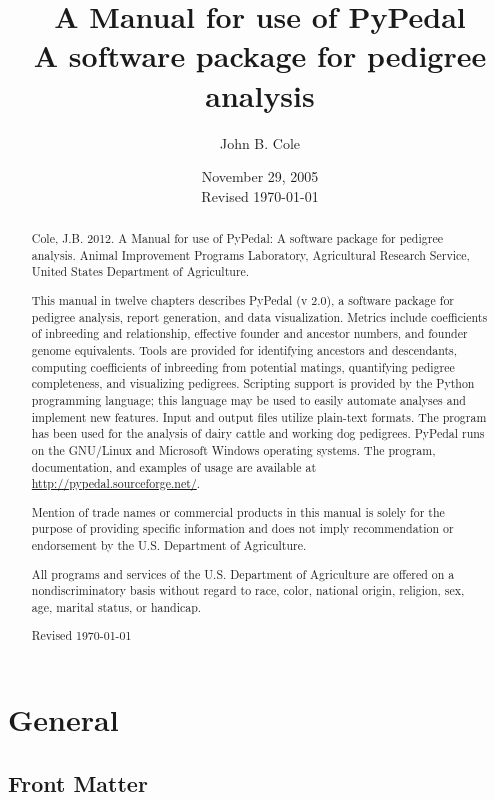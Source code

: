 \documentclass[letterpaper,hyperref,titlepage]{manual}
\title{A Manual for use of PyPedal\\A software package for pedigree analysis}
\author{John B. Cole}
\date{November 29, 2005 \\ Revised \today}                   %
\begin{document}
\maketitle

\begin{abstract}
Cole, J.B.  2012.  A Manual for use of PyPedal: A software package for pedigree analysis.  Animal Improvement Programs Laboratory, Agricultural Research Service, United States Department of Agriculture.

This manual in twelve chapters describes PyPedal (v 2.0), a software package for pedigree analysis, report generation, and data visualization.  Metrics include coefficients of inbreeding and relationship, effective founder and ancestor numbers, and founder genome equivalents.  Tools are provided for identifying ancestors and descendants, computing coefficients of inbreeding from potential matings, quantifying pedigree completeness, and visualizing pedigrees.  Scripting support is provided by the Python programming language; this language may be used to easily automate analyses and implement new features. Input and output files utilize plain-text formats.  The program has been used for the analysis of dairy cattle and working dog pedigrees.  PyPedal runs on the GNU/Linux and Microsoft Windows operating systems.  The program, documentation, and examples of usage are available at \url{http://pypedal.sourceforge.net/}.

Mention of trade names or commercial products in this manual is solely for the purpose of providing specific information and does not imply recommendation or endorsement by the U.S. Department of Agriculture.

All programs and services of the U.S. Department of Agriculture are offered on a nondiscriminatory basis without regard to race, color, national origin, religion, sex, age, marital status, or handicap.

Revised \today
\end{abstract}

\ifhtml
\part*{General}
\chapter*{Front Matter}
\label{front}
\fi



\tableofcontents
\listoftables
\listoffigures


















\printindex
\printindex[func]
\end{document}
